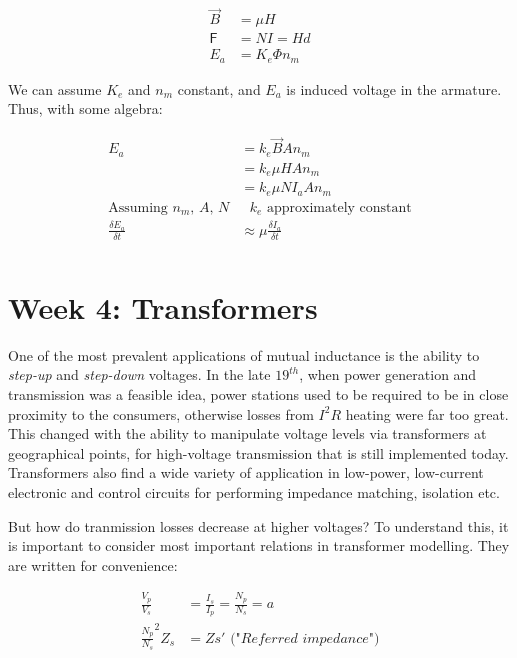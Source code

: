 \documentclass{book}
\begin{document}
\begin{align*}
	\vec{B} &= \mu H \\
	\mathsf{F} &= NI = Hd \\
	E_a &= K_e \Phi n_m
\end{align*}

We can assume $K_e$ and $n_m$ constant, and $E_a$ is induced voltage in the armature. Thus, with some algebra:

\begin{align*}
	E_a &= k_e \vec{B} A n_m \\
	 &= k_e \mu H A n_m \\
	&=  k_e \mu N I_a A n_m \\
	\text{Assuming $n_m$, $A$, $N$}&\text{ $k_e$ approximately constant} \\
	\frac{\delta{E_a}}{\delta t} &\approx \mu \frac{\delta I_a}{\delta{t}} \\
\end{align*}



\section{Week 4: Transformers}

One of the most prevalent applications of mutual inductance is the ability to \textit{step-up} and \textit{step-down} voltages. In the late $19^{th}$, when power generation and transmission was a feasible idea, power stations used to be required to be in close proximity to the consumers, otherwise losses from $I^2R$ heating were far too great. This changed with the ability to manipulate voltage levels via transformers at geographical points, for high-voltage transmission that is still implemented today. Transformers also find a wide variety of application in low-power, low-current electronic and control circuits for performing impedance matching, isolation etc. \newline

But how do tranmission losses decrease at higher voltages? To understand this, it is important to consider most important relations in transformer modelling. They are written for convenience:

\begin{align*}
	\frac{V_p}{V_s} &= \frac{I_s}{I_p} =  \frac{N_p}{N_s} = a \\
	\frac{N_p}{N_s}^2 Z_s &= Zs' \textit{ ("Referred impedance")}
\end{align*}
\end{document}
